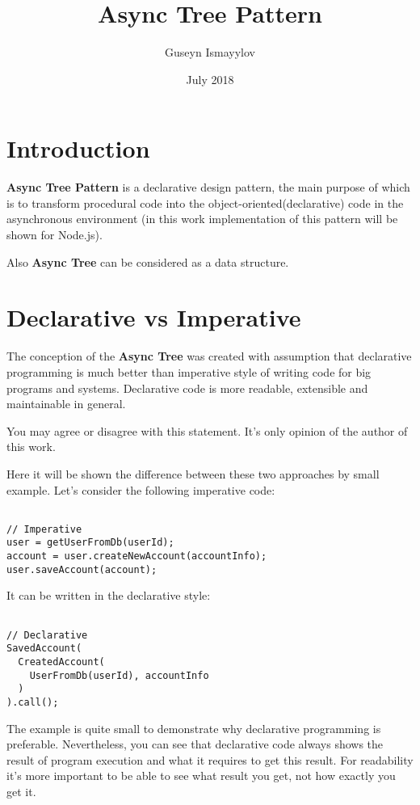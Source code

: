 \documentclass{article}
\title{Async Tree Pattern}
\author{Guseyn Ismayylov}
\date{July 2018}
\begin{document}
\maketitle

\section{Introduction}

\textbf{Async Tree Pattern} is a declarative design pattern, the main purpose of which is to transform procedural code into the object-oriented(declarative) code in the asynchronous environment (in this work implementation of this pattern will be shown for Node.js).

Also \textbf{Async Tree} can be considered as a data structure.
\section{Declarative vs Imperative}

The conception of the \textbf{Async Tree} was created with assumption that declarative programming is much better than imperative style of writing code for big programs and systems. Declarative code is more readable, extensible and maintainable in general.

You may agree or disagree with this statement. It's only opinion of the author of this work.

Here it will be shown the difference between these two approaches by small example. Let's consider the following imperative code:  

\begin{lstlisting}

// Imperative
user = getUserFromDb(userId);
account = user.createNewAccount(accountInfo);
user.saveAccount(account);

\end{lstlisting}

It can be written in the declarative style:

\begin{lstlisting}

// Declarative
SavedAccount(
  CreatedAccount(
    UserFromDb(userId), accountInfo
  )
).call();

\end{lstlisting}

The example is quite small to demonstrate why declarative programming is preferable. Nevertheless, you can see that declarative code always shows the result of program execution and what it requires to get this result. For readability it's more important to be able to see what result you get, not how exactly you get it.
\end{document}
